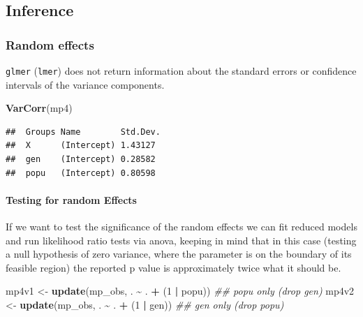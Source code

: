 \documentclass[
  12pt,
]{book}
\newenvironment{Shaded}{\begin{snugshade}}{\end{snugshade}}
\newcommand{\CommentTok}[1]{\textcolor[rgb]{0.56,0.35,0.01}{\textit{#1}}}
\newcommand{\DecValTok}[1]{\textcolor[rgb]{0.00,0.00,0.81}{#1}}
\newcommand{\KeywordTok}[1]{\textcolor[rgb]{0.13,0.29,0.53}{\textbf{#1}}}
\newcommand{\NormalTok}[1]{#1}
\newcommand{\OperatorTok}[1]{\textcolor[rgb]{0.81,0.36,0.00}{\textbf{#1}}}
\newcommand{\StringTok}[1]{\textcolor[rgb]{0.31,0.60,0.02}{#1}}
\begin{document}
\hypertarget{inference}{%
\subsection{Inference}\label{inference}}

\hypertarget{random-effects}{%
\subsubsection{Random effects}\label{random-effects}}

\texttt{glmer} (\texttt{lmer}) does not return information about the standard errors or confidence intervals of the variance components.

\begin{Shaded}
\begin{Highlighting}[]
\KeywordTok{VarCorr}\NormalTok{(mp4)}
\end{Highlighting}
\end{Shaded}

\begin{verbatim}
##  Groups Name        Std.Dev.
##  X      (Intercept) 1.43127 
##  gen    (Intercept) 0.28582 
##  popu   (Intercept) 0.80598
\end{verbatim}

\hypertarget{testing-for-random-effects-1}{%
\paragraph{Testing for random Effects}\label{testing-for-random-effects-1}}

If we want to test the significance of the random effects we can fit reduced models and run likelihood ratio tests via anova, keeping in mind that in this case (testing a null hypothesis of zero variance, where the parameter is on the boundary of its feasible region) the reported p value is approximately twice what it should be.

\begin{Shaded}
\begin{Highlighting}[]
\NormalTok{mp4v1 \textless{}{-}}\StringTok{ }\KeywordTok{update}\NormalTok{(mp\_obs, . }\OperatorTok{\textasciitilde{}}\StringTok{ }\NormalTok{. }\OperatorTok{+}\StringTok{ }\NormalTok{(}\DecValTok{1} \OperatorTok{|}\StringTok{ }\NormalTok{popu)) }\CommentTok{\#\# popu only (drop gen)}
\NormalTok{mp4v2 \textless{}{-}}\StringTok{ }\KeywordTok{update}\NormalTok{(mp\_obs, . }\OperatorTok{\textasciitilde{}}\StringTok{ }\NormalTok{. }\OperatorTok{+}\StringTok{ }\NormalTok{(}\DecValTok{1} \OperatorTok{|}\StringTok{ }\NormalTok{gen)) }\CommentTok{\#\# gen only (drop popu)}
\end{Highlighting}
\end{Shaded}
\end{document}
